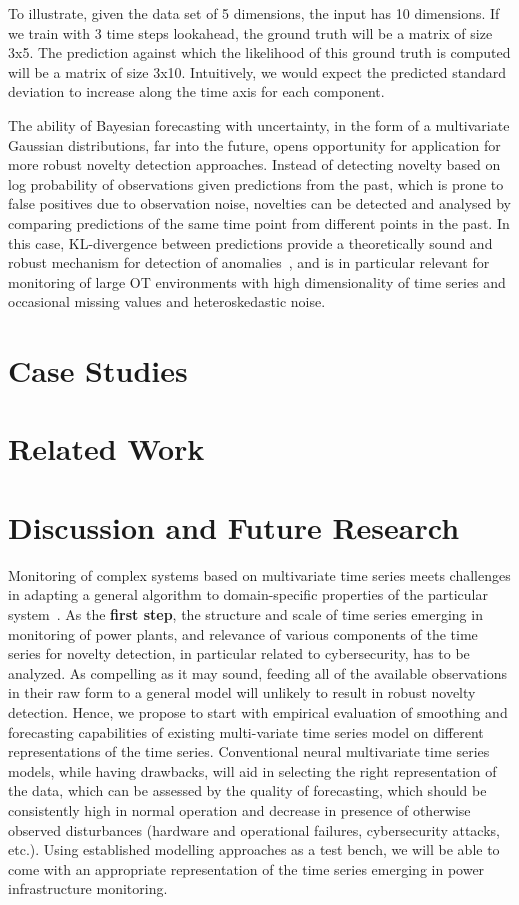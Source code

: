 \documentclass[runningheads]{llncs}
\begin{document}
To illustrate, given the data set of 5 dimensions, the input has 10
dimensions. If we train with 3 time steps lookahead, the ground
truth will be a matrix of size 3x5. The prediction against
which the likelihood of this ground truth is computed will be
a matrix of size 3x10. Intuitively, we would expect the
predicted standard deviation to increase along the time axis
for each component.

The ability of Bayesian forecasting with uncertainty, in the form of a multivariate Gaussian distributions, far into the future, opens opportunity for application for more robust novelty detection
approaches. Instead of detecting novelty based on log probability of observations given predictions from the past, which is prone to false positives due to observation noise, novelties can be detected and analysed by comparing predictions of the same time point from different points in the past. In this case, KL-divergence between predictions provide a theoretically sound and robust mechanism for detection of anomalies~\cite{10.1145/3297280.3297414}, and is in particular relevant for monitoring of large OT environments with high dimensionality of time series and occasional missing values and heteroskedastic noise.

\section{Case Studies}


\section{Related Work} 

\section{Discussion and Future Research}

Monitoring of complex systems based on multivariate time series meets
challenges in adapting a general algorithm to  domain-specific properties of
the particular system~\cite{DBLP:conf/iccst/DymshitsMT17}. As the \textbf{first
step}, the structure and scale of time series emerging in monitoring of power
plants, and relevance of various components of the time series for novelty
detection, in particular related to cybersecurity, has to be analyzed. As
compelling as it may sound, feeding all of the available observations in their
raw form to a general model will unlikely to result in robust novelty
detection. Hence, we propose to start with empirical evaluation of smoothing
and forecasting capabilities of existing multi-variate time series model on
different representations of the time series. Conventional neural multivariate
time series models, while having drawbacks, will aid in selecting the right
representation of the data, which can be assessed by the quality of
forecasting, which should be consistently high in normal operation and decrease
in presence of otherwise observed disturbances (hardware and operational
failures, cybersecurity attacks, etc.). Using established modelling approaches
as a test bench, we will be able to come with an appropriate representation of
the time series emerging in power infrastructure monitoring.
\end{document}

